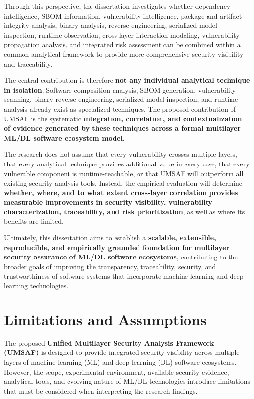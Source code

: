 \documentclass[
  12pt,
  letterpaper,
  oneside]{report}
\begin{document}
Through this perspective, the dissertation investigates whether
dependency intelligence, SBOM information, vulnerability intelligence,
package and artifact integrity analysis, binary analysis, reverse
engineering, serialized-model inspection, runtime observation,
cross-layer interaction modeling, vulnerability propagation analysis,
and integrated risk assessment can be combined within a common
analytical framework to provide more comprehensive security visibility
and traceability.

The central contribution is therefore \textbf{not any individual
analytical technique in isolation}. Software composition analysis, SBOM
generation, vulnerability scanning, binary reverse engineering,
serialized-model inspection, and runtime analysis already exist as
specialized techniques. The proposed contribution of UMSAF is the
systematic \textbf{integration, correlation, and contextualization of
evidence generated by these techniques across a formal multilayer ML/DL
software ecosystem model}.

The research does not assume that every vulnerability crosses multiple
layers, that every analytical technique provides additional value in
every case, that every vulnerable component is runtime-reachable, or
that UMSAF will outperform all existing security-analysis tools.
Instead, the empirical evaluation will determine \textbf{whether, where,
and to what extent cross-layer correlation provides measurable
improvements in security visibility, vulnerability characterization,
traceability, and risk prioritization}, as well as where its benefits
are limited.

Ultimately, this dissertation aims to establish a \textbf{scalable,
extensible, reproducible, and empirically grounded foundation for
multilayer security assurance of ML/DL software ecosystems},
contributing to the broader goals of improving the transparency,
traceability, security, and trustworthiness of software systems that
incorporate machine learning and deep learning technologies.

\chapter{Limitations and Assumptions}\label{13-limitations-and-assumptions}

The proposed \textbf{Unified Multilayer Security Analysis Framework
(UMSAF)} is designed to provide integrated security visibility across
multiple layers of machine learning (ML) and deep learning (DL) software
ecosystems. However, the scope, experimental environment, available
security evidence, analytical tools, and evolving nature of ML/DL
technologies introduce limitations that must be considered when
interpreting the research findings.
\end{document}

